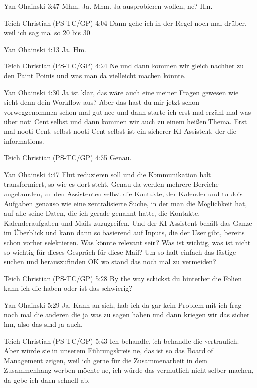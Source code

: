 Yan Ohainski   3:47
Mhm.
Ja.
Mhm.
Ja ausprobieren wollen, ne?
Hm.

Teich Christian (PS-TC/GP)   4:04
Dann gehe ich in der Regel noch mal drüber, weil ich sag mal so 20 bis 30%

Yan Ohainski   4:13
Ja.
Hm.

Teich Christian (PS-TC/GP)   4:24
Ne und dann kommen wir gleich nachher zu den Paint Points und was man da vielleicht machen könnte.

Yan Ohainski   4:30
Ja ist klar, das wäre auch eine meiner Fragen gewesen wie sieht denn dein Workflow aus? Aber das hast du mir jetzt schon vorweggenommen schon mal gut nee und dann starte ich erst mal erzähl mal was über noti Cent selbst und dann kommen wir auch zu einem heißen Thema. Erst mal nooti Cent, selbst nooti Cent selbst ist ein sicherer KI Assistent, der die informations.

Teich Christian (PS-TC/GP)   4:35
Genau.

Yan Ohainski   4:47
Flut reduzieren soll und die Kommunikation halt transformiert, so wie es dort steht. Genau da werden mehrere Bereiche angebunden, an den Assistenten selbst die Kontakte, der Kalender und to do's Aufgaben genauso wie eine zentralisierte Suche, in der man die Möglichkeit hat, auf alle seine Daten, die ich gerade genannt hatte, die Kontakte, Kalenderaufgaben und Mails zuzugreifen.
Und der KI Assistent behält das Ganze im Überblick und kann dann so basierend auf Inputs, die der User gibt, bereits schon vorher selektieren. Was könnte relevant sein? Was ist wichtig, was ist nicht so wichtig für dieses Gespräch für diese Mail?
Um so halt einfach das lästige suchen und herauszufinden OK wo stand das noch mal zu vermeiden?

Teich Christian (PS-TC/GP)   5:28
By the way schickst du hinterher die Folien kann ich die haben oder ist das schwierig?

Yan Ohainski   5:29
Ja.
Kann an sich, hab ich da gar kein Problem mit ich frag noch mal die anderen die ja was zu sagen haben und dann kriegen wir das sicher hin, also das sind ja auch.

Teich Christian (PS-TC/GP)   5:43
Ich behandle, ich behandle die vertraulich. Aber würde sie in unserem Führungskreis ne, das ist so das Board of Management zeigen, weil ich gerne für die Zusammenarbeit in dem Zusammenhang werben möchte ne, ich würde das vermutlich nicht selber machen, da gebe ich dann schnell ab.

